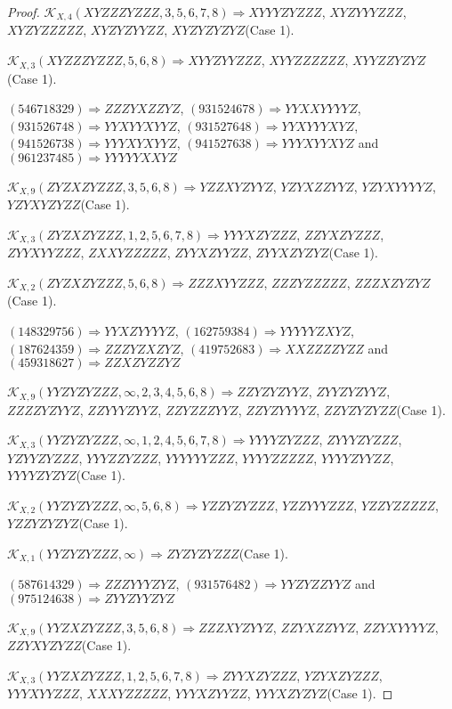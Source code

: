 \documentclass[12pt]{article}
\theoremstyle{plain}
\theoremstyle{definition}
\theoremstyle{remark}
\newcommand{\fancy}[1]{\mathcal{#1}}
\def\K{\fancy{K}}
\begin{document}
\begin{proof}
	$\K_{X,4}(XYZZZYZZZ,3, 5, 6, 7, 8)\Rightarrow $$XYYYZYZZZ$, $XYZYYYZZZ$, $XYZYZZZZZ$, $XYZYZYYZZ$, $XYZYZYZYZ$(Case 1).
	
	$\K_{X,3}(XYZZZYZZZ,5, 6, 8)\Rightarrow $$XYYZYYZZZ$, $XYYZZZZZZ$, $XYYZZYZYZ$(Case 1).
	
	
	
	$(5 4 6 7 1 8 3 2 9)\Rightarrow ZZZYXZZYZ$, $(9 3 1 5 2 4 6 7 8)\Rightarrow YYXXYYYYZ$, $(9 3 1 5 2 6 7 4 8)\Rightarrow YYXYYXYYZ$, $(9 3 1 5 2 7 6 4 8)\Rightarrow YYXYYYXYZ$, $(9 4 1 5 2 6 7 3 8)\Rightarrow YYYXYXYYZ$, $(9 4 1 5 2 7 6 3 8)\Rightarrow YYYXYYXYZ$ and $(9 6 1 2 3 7 4 8 5)\Rightarrow YYYYYXXYZ$
	
	
	$\K_{X,9}(ZYZXZYZZZ,3, 5, 6, 8)\Rightarrow $$YZZXYZYYZ$, $YZYXZZYYZ$, $YZYXYYYYZ$, $YZYXYZYZZ$(Case 1).
	
	$\K_{X,3}(ZYZXZYZZZ,1, 2, 5, 6, 7, 8)\Rightarrow $$YYYXZYZZZ$, $ZZYXZYZZZ$, $ZYYXYYZZZ$, $ZXXYZZZZZ$, $ZYYXZYYZZ$, $ZYYXZYZYZ$(Case 1).
	
	$\K_{X,2}(ZYZXZYZZZ,5, 6, 8)\Rightarrow $$ZZZXYYZZZ$, $ZZZYZZZZZ$, $ZZZXZYZYZ$(Case 1).
	
	
	
	$(1 4 8 3 2 9 7 5 6)\Rightarrow YYXZYYYYZ$, $(1 6 2 7 5 9 3 8 4)\Rightarrow YYYYYZXYZ$, $(1 8 7 6 2 4 3 5 9)\Rightarrow ZZZYZXZYZ$, $(4 1 9 7 5 2 6 8 3)\Rightarrow XXZZZZYZZ$ and $(4 5 9 3 1 8 6 2 7)\Rightarrow ZZXZYZZYZ$
	
	
	$\K_{X,9}(YYZYZYZZZ,\infty,2, 3, 4, 5, 6, 8)\Rightarrow $$ZZYZYZYYZ$, $ZYYZYZYYZ$, $ZZZZYZYYZ$, $ZZYYYZYYZ$, $ZZYZZZYYZ$, $ZZYZYYYYZ$, $ZZYZYZYZZ$(Case 1).
	
	$\K_{X,3}(YYZYZYZZZ,\infty,1, 2, 4, 5, 6, 7, 8)\Rightarrow $$YYYYZYZZZ$, $ZYYYZYZZZ$, $YZYYZYZZZ$, $YYYZZYZZZ$, $YYYYYYZZZ$, $YYYYZZZZZ$, $YYYYZYYZZ$, $YYYYZYZYZ$(Case 1).
	
	$\K_{X,2}(YYZYZYZZZ,\infty,5, 6, 8)\Rightarrow $$YZZYZYZZZ$, $YZZYYYZZZ$, $YZZYZZZZZ$, $YZZYZYZYZ$(Case 1).
	
	$\K_{X,1}(YYZYZYZZZ,\infty)\Rightarrow $$ZYZYZYZZZ$(Case 1).
	
	
	
	$(5 8 7 6 1 4 3 2 9)\Rightarrow ZZZYYYZYZ$, $(9 3 1 5 7 6 4 8 2)\Rightarrow YYZYZZYYZ$ and $(9 7 5 1 2 4 6 3 8)\Rightarrow ZYYZYYZYZ$
	
	
	$\K_{X,9}(YYZXZYZZZ,3, 5, 6, 8)\Rightarrow $$ZZZXYZYYZ$, $ZZYXZZYYZ$, $ZZYXYYYYZ$, $ZZYXYZYZZ$(Case 1).
	
	$\K_{X,3}(YYZXZYZZZ,1, 2, 5, 6, 7, 8)\Rightarrow $$ZYYXZYZZZ$, $YZYXZYZZZ$, $YYYXYYZZZ$, $XXXYZZZZZ$, $YYYXZYYZZ$, $YYYXZYZYZ$(Case 1).
	

\end{proof}
\end{document}
